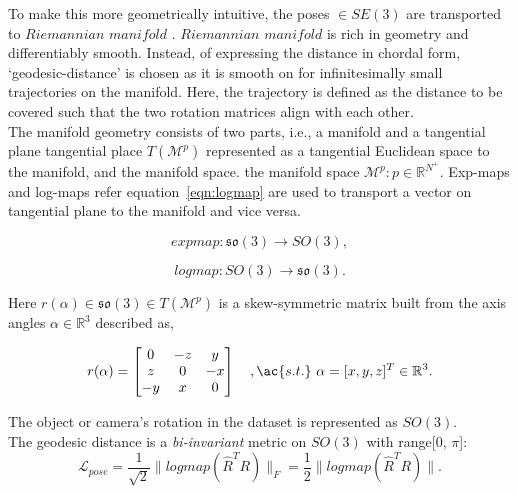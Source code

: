 To make this more geometrically intuitive, the poses $\in SE(3)$ are transported to $Riemannian$ $manifold$ \cite{lee2018introduction}.
$Riemannian$ $manifold$ is rich in geometry and differentiably smooth.
Instead, of expressing the distance in chordal form, `geodesic-distance' is chosen as it is smooth on for infinitesimally small trajectories on the manifold.
Here, the trajectory is defined as the distance to be covered such that the two rotation matrices align with each other.\\

The manifold geometry consists of two parts, i.e., a manifold and  a tangential plane tangential place $T(\mathcal{M}^p)$ represented as a tangential Euclidean space to the manifold, and the manifold space. the manifold space \( \mathcal{M}^p: p \in \mathbb{R}^{N^+}\).
Exp-maps and log-maps refer equation~\ref{eqn:logmap} are used to transport a vector on tangential plane to the manifold and vice versa.

\begin{equation}
    expmap: \mathfrak{so}(3) \rightarrow SO(3),
\end{equation}

\begin{equation}
    \label{eqn:logmap}
    logmap: SO (3) \rightarrow \mathfrak{so}(3).
\end{equation}

Here $r(\alpha) \in \mathfrak{so}(3) \in  T(\mathcal{M}^p)$ is a skew-symmetric matrix built from the axis angles $\alpha \in \mathbb{R}^3$ described as,

\begin{equation}
    r(\alpha) = \begin{bmatrix}
        0  & -z & y  \\
        z  & 0  & -x \\
        -y & x  & 0
    \end{bmatrix} \quad, \ac{s.t.} \ \alpha = [x, y, z]^T \in  \mathbb{R}^3.
\end{equation}

The object or camera's rotation in the dataset is represented as $SO(3)$.\\

The geodesic distance is a \emph{bi-invariant} metric on $SO(3)$ with range[0, $\pi$]:
\begin{equation}
    \label{eqn:geodesic}
    \mathcal{L}_{pose} = \dfrac{1}{\sqrt{2}} \| logmap(\hat{R}^T R) \|_F = \dfrac{1}{2} \| logmap(\hat{R}^T R) \|.
\end{equation}

